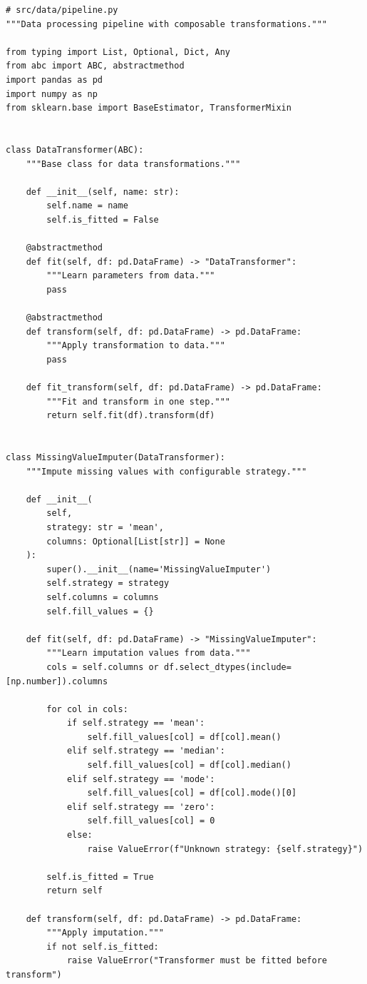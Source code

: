 \begin{lstlisting}[style=python, caption=Modular data processing pipeline]
# src/data/pipeline.py
"""Data processing pipeline with composable transformations."""

from typing import List, Optional, Dict, Any
from abc import ABC, abstractmethod
import pandas as pd
import numpy as np
from sklearn.base import BaseEstimator, TransformerMixin


class DataTransformer(ABC):
    """Base class for data transformations."""

    def __init__(self, name: str):
        self.name = name
        self.is_fitted = False

    @abstractmethod
    def fit(self, df: pd.DataFrame) -> "DataTransformer":
        """Learn parameters from data."""
        pass

    @abstractmethod
    def transform(self, df: pd.DataFrame) -> pd.DataFrame:
        """Apply transformation to data."""
        pass

    def fit_transform(self, df: pd.DataFrame) -> pd.DataFrame:
        """Fit and transform in one step."""
        return self.fit(df).transform(df)


class MissingValueImputer(DataTransformer):
    """Impute missing values with configurable strategy."""

    def __init__(
        self,
        strategy: str = 'mean',
        columns: Optional[List[str]] = None
    ):
        super().__init__(name='MissingValueImputer')
        self.strategy = strategy
        self.columns = columns
        self.fill_values = {}

    def fit(self, df: pd.DataFrame) -> "MissingValueImputer":
        """Learn imputation values from data."""
        cols = self.columns or df.select_dtypes(include=[np.number]).columns

        for col in cols:
            if self.strategy == 'mean':
                self.fill_values[col] = df[col].mean()
            elif self.strategy == 'median':
                self.fill_values[col] = df[col].median()
            elif self.strategy == 'mode':
                self.fill_values[col] = df[col].mode()[0]
            elif self.strategy == 'zero':
                self.fill_values[col] = 0
            else:
                raise ValueError(f"Unknown strategy: {self.strategy}")

        self.is_fitted = True
        return self

    def transform(self, df: pd.DataFrame) -> pd.DataFrame:
        """Apply imputation."""
        if not self.is_fitted:
            raise ValueError("Transformer must be fitted before transform")


\end{lstlisting}
